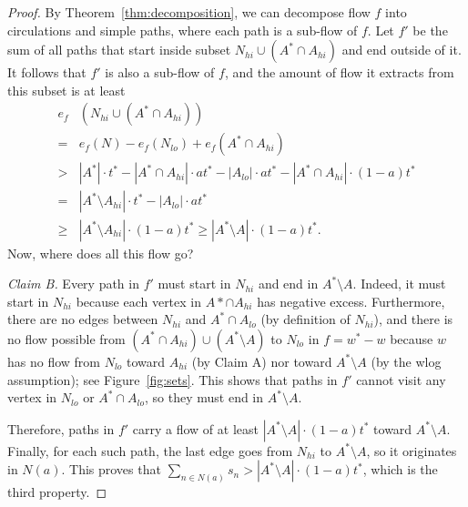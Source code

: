 \begin{proof}
By Theorem~\ref{thm:decomposition}, we can decompose flow $f$ into circulations and simple paths, where each path is a sub-flow of $f$. 
Let $f'$ be the sum of all paths that start inside subset $N_{hi}\cup(A^*\cap A_{hi})$ and end outside of it. 
It follows that $f'$ is also a sub-flow of $f$, and the amount of flow it extracts from this subset is at least
\begin{align*}
e_f & (N_{hi}\cup(A^*\cap A_{hi})) \\
=& e_f(N) - e_f(N_{lo}) + e_f(A^*\cap A_{hi}) \\
>& |A^*|\cdot t^* - |A^*\cap A_{hi}|\cdot a t^* - |A_{lo}|\cdot at^* - |A^*\cap A_{hi}|\cdot (1-a)t^* \\
=& |A^*\setminus A_{hi}|\cdot t^* - |A_{lo}|\cdot at^* \\
\geq & |A^* \setminus A_{hi}|\cdot (1-a)t^* \geq |A^* \setminus A|\cdot (1-a)t^*.
\end{align*}
Now, where does all this flow go?

\emph{Claim B.} Every path in $f'$ must start in $N_{hi}$ and end in $A^*\setminus A$. 
Indeed, it must start in $N_{hi}$ because each vertex in $A*\cap A_{hi}$ has negative excess. 
Furthermore, there are no edges between $N_{hi}$ and $A^*\cap A_{lo}$ (by definition of $N_{hi}$), and there is no flow possible from $(A^*\cap A_{hi})\cup (A^*\setminus A)$ to $N_{lo}$ in $f=w^*-w$ because $w$ has no flow from $N_{lo}$ toward $A_{hi}$ (by Claim A) nor toward $A^*\setminus A$ (by the wlog assumption); see Figure~\ref{fig:sets}. 
This shows that paths in $f'$ cannot visit any vertex in $N_{lo}$ or $A^*\cap A_{lo}$, so they must end in $A^*\setminus A$.

Therefore, paths in $f'$ carry a flow of at least $|A^* \setminus A|\cdot (1-a)t^*$ toward $A^*\setminus A$. 
Finally, for each such path, the last edge goes from $N_{hi}$ to $A^*\setminus A$, so it originates in $N(a)$. 
This proves that $\sum_{n\in N(a)} s_n> |A^* \setminus A|\cdot (1-a) t^*$, which is the third property.
\end{proof}